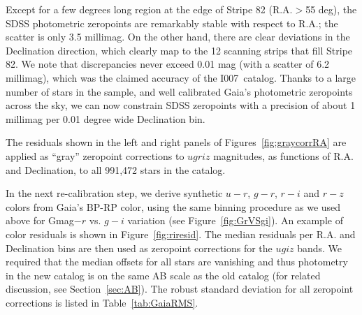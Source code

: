 \documentclass[fleqn,usenatbib]{mnras}
\newcommand{\pOc}{\hbox{I007 catalog}}
\begin{document}
Except for a few degrees long region at the edge of Stripe 82 (R.A.$>$55 deg), the
SDSS photometric zeropoints are remarkably stable with respect to R.A.; the scatter
is only 3.5 millimag. On the other hand, there are clear deviations in the Declination 
direction, which clearly map to the 12 scanning strips that fill Stripe 82. We note
that discrepancies never exceed 0.01 mag (with a scatter of 6.2 millimag), which was 
the claimed accuracy of the \pOc. Thanks to a large number of stars in the sample,
and well calibrated Gaia's photometric zeropoints across the sky, we can now 
constrain SDSS zeropoints with a precision of about 1 millimag per 0.01 degree
wide Declination bin. 

The residuals shown in the left and right panels of Figures~\ref{fig:graycorrRA} are
applied as ``gray'' zeropoint corrections to $ugriz$ magnitudes, as functions of 
R.A. and Declination, to all 991,472 stars in the catalog. %

In the next re-calibration step, we derive synthetic $u-r$, $g-r$, $r-i$ and $r-z$ colors
from Gaia's BP-RP color, using the same binning procedure as we used above for 
Gmag$-r$ vs. $g-i$ variation (see Figure~\ref{fig:GrVSgi}). An example of color residuals 
is shown in Figure~\ref{fig:riresid}.  The median residuals per R.A. and Declination bins 
are then used as zeropoint corrections for the $ugiz$ bands. We required that the median
offsets for all stars are vanishing and thus photometry in the new catalog is on the 
same AB scale as the old catalog (for related discussion, see Section~\ref{sec:AB}). 
The robust standard deviation for all zeropoint corrections is listed in Table~\ref{tab:GaiaRMS}. 

\end{document}
